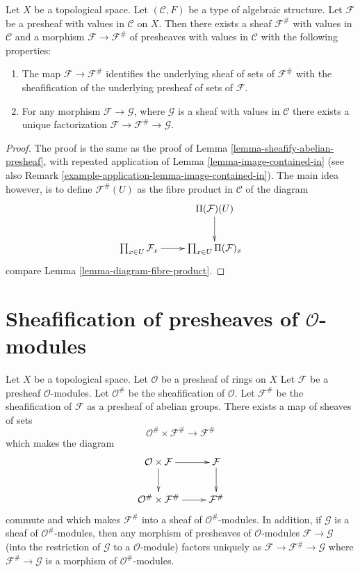 \begin{lemma}
\label{lemma-sheafify-presheaf-structures}
Let $X$ be a topological space.
Let $(\mathcal{C}, F)$ be a type of algebraic structure.
Let $\mathcal{F}$ be a presheaf with values in $\mathcal{C}$
on $X$. Then there exists a sheaf $\mathcal{F}^\#$ with values
in $\mathcal{C}$ and a morphism $\mathcal{F} \to \mathcal{F}^\#$
of presheaves with values in $\mathcal{C}$ with the
following properties:
\begin{enumerate}
\item The map $\mathcal{F} \to \mathcal{F}^\#$ identifies
the underlying sheaf of sets of $\mathcal{F}^\#$ with
the sheafification of the underlying presheaf of sets of $\mathcal{F}$.
\item For any morphism $\mathcal{F} \to \mathcal{G}$, where
$\mathcal{G}$ is a sheaf with values in $\mathcal{C}$ there exists
a unique factorization $\mathcal{F} \to \mathcal{F}^\# \to \mathcal{G}$.
\end{enumerate}
\end{lemma}

\begin{proof}
The proof is the same as the proof of
Lemma \ref{lemma-sheafify-abelian-presheaf},
with repeated application of
Lemma \ref{lemma-image-contained-in} (see also
Remark \ref{example-application-lemma-image-contained-in}).
The main idea however, is to define $\mathcal{F}^\#(U)$
as the fibre product in $\mathcal{C}$ of the diagram
$$
\xymatrix{
 &
\Pi(\mathcal{F})(U) \ar[d] \\
\prod_{x \in U} \mathcal{F}_x
\ar[r] &
\prod_{x \in U} \Pi(\mathcal{F})_x
}
$$
compare Lemma \ref{lemma-diagram-fibre-product}.
\end{proof}

\section{Sheafification of presheaves of $\mathcal{O}$-modules}
\label{section-sheafification-presheaves-modules}

\begin{lemma}
\label{lemma-sheafification-presheaf-modules}
Let $X$ be a topological space.
Let $\mathcal{O}$ be a presheaf of rings on $X$
Let $\mathcal{F}$ be a presheaf $\mathcal{O}$-modules.
Let $\mathcal{O}^\#$ be the sheafification of $\mathcal{O}$.
Let $\mathcal{F}^\#$ be the sheafification of $\mathcal{F}$
as a presheaf of abelian groups. There exists a map of
sheaves of sets
$$
\mathcal{O}^\# \times \mathcal{F}^\#
\longrightarrow
\mathcal{F}^\#
$$
which makes the diagram
$$
\xymatrix{
\mathcal{O} \times \mathcal{F} \ar[r] \ar[d] &
\mathcal{F} \ar[d] \\
\mathcal{O}^\# \times \mathcal{F}^\# \ar[r] &
\mathcal{F}^\#
}
$$
commute and which makes $\mathcal{F}^\#$ into a sheaf
of $\mathcal{O}^\#$-modules. In addition, if $\mathcal{G}$
is a sheaf of $\mathcal{O}^\#$-modules, then any morphism
of presheaves of $\mathcal{O}$-modules $\mathcal{F} \to \mathcal{G}$
(into the restriction of $\mathcal{G}$ to a $\mathcal{O}$-module)
factors uniquely as $\mathcal{F} \to \mathcal{F}^\# \to \mathcal{G}$
where $\mathcal{F}^\# \to \mathcal{G}$ is a morphism of
$\mathcal{O}^\#$-modules.
\end{lemma}

